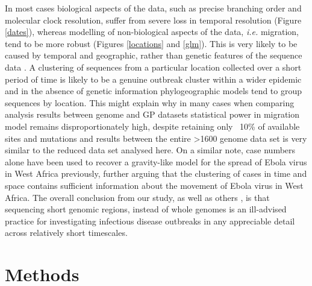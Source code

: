 \documentclass[11pt,oneside,letterpaper]{article}
\begin{document}
In most cases biological aspects of the data, such as precise branching order and molecular clock resolution, suffer from severe loss in temporal resolution (Figure \ref{dates}), whereas modelling of non-biological aspects of the data, \textit{i.e.} migration, tend to be more robust (Figures \ref{locations} and \ref{glm}).
This is very likely to be caused by temporal and geographic, rather than genetic features of the sequence data \citep{boskova_influence_2018}.
A clustering of sequences from a particular location collected over a short period of time is likely to be a genuine outbreak cluster within a wider epidemic and in the absence of genetic information phylogeographic models tend to group sequences by location.
This might explain why in many cases when comparing analysis results between genome and GP datasets statistical power in migration model remains disproportionately high, despite retaining only ~10\% of available sites and mutations and results between the entire >1600 genome data set \citep{dudas_virus_2017} is very similar to the reduced data set analysed here.
On a similar note, case numbers alone have been used to recover a gravity-like model for the spread of Ebola virus in West Africa \citep{kramer_spatial_2016} previously, further arguing that the clustering of cases in time and space contains sufficient information about the movement of Ebola virus in West Africa.
The overall conclusion from our study, as well as others \citep{wohl_co-circulating_2018}, is that sequencing short genomic regions, instead of whole genomes is an ill-advised practice for investigating infectious disease outbreaks in any appreciable detail across relatively short timescales.

\section*{Methods}
\end{document}
